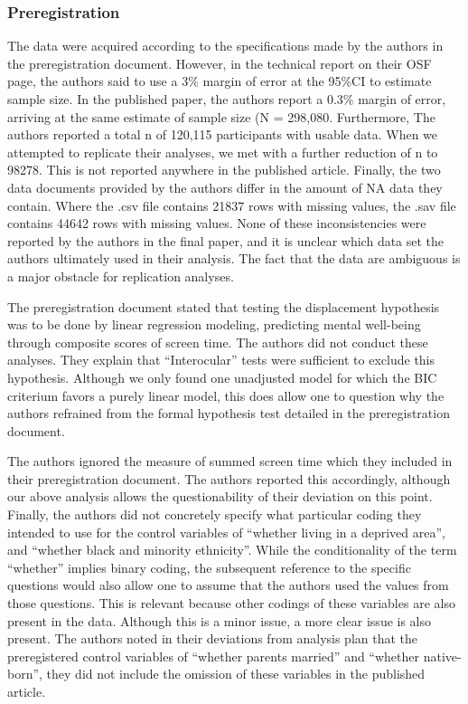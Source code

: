 \documentclass[man]{apa6}
\theoremstyle{definition}
\theoremstyle{definition}
\theoremstyle{definition}
\theoremstyle{remark}
\begin{document}
\hypertarget{preregistration}{%
\subsubsection{Preregistration}\label{preregistration}}

The data were acquired according to the specifications made by the
authors in the preregistration document. However, in the technical
report on their OSF page, the authors said to use a 3\% margin of error
at the 95\%CI to estimate sample size. In the published paper, the
authors report a 0.3\% margin of error, arriving at the same estimate of
sample size (N = 298,080. Furthermore, The authors reported a total n of
120,115 participants with usable data. When we attempted to replicate
their analyses, we met with a further reduction of n to 98278. This is
not reported anywhere in the published article. Finally, the two data
documents provided by the authors differ in the amount of NA data they
contain. Where the .csv file contains 21837 rows with missing values,
the .sav file contains 44642 rows with missing values. None of these
inconsistencies were reported by the authors in the final paper, and it
is unclear which data set the authors ultimately used in their analysis.
The fact that the data are ambiguous is a major obstacle for replication
analyses.

The preregistration document stated that testing the displacement
hypothesis was to be done by linear regression modeling, predicting
mental well-being through composite scores of screen time. The authors
did not conduct these analyses. They explain that \enquote{Interocular}
tests were sufficient to exclude this hypothesis. Although we only found
one unadjusted model for which the BIC criterium favors a purely linear
model, this does allow one to question why the authors refrained from
the formal hypothesis test detailed in the preregistration document.

The authors ignored the measure of summed screen time which they
included in their preregistration document. The authors reported this
accordingly, although our above analysis allows the questionability of
their deviation on this point. Finally, the authors did not concretely
specify what particular coding they intended to use for the control
variables of \enquote{whether living in a deprived area}, and
\enquote{whether black and minority ethnicity}. While the conditionality
of the term \enquote{whether} implies binary coding, the subsequent
reference to the specific questions would also allow one to assume that
the authors used the values from those questions. This is relevant
because other codings of these variables are also present in the data.
Although this is a minor issue, a more clear issue is also present. The
authors noted in their deviations from analysis plan that the
preregistered control variables of \enquote{whether parents married} and
\enquote{whether native-born}, they did not include the omission of
these variables in the published article.
\end{document}
